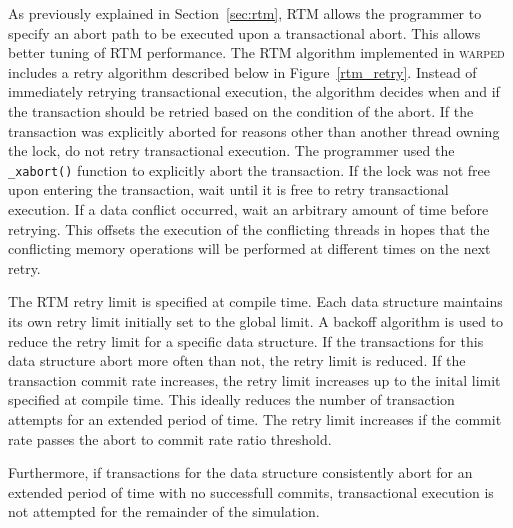 \documentclass[11pt]{book}
\begin{document}
As previously explained in Section~\ref{sec:rtm}, RTM allows the programmer to specify an
abort path to be executed upon a transactional abort.  This allows better tuning of RTM
performance.  The RTM algorithm implemented in \textsc{warped} includes a retry algorithm
described below in Figure~\ref{rtm_retry}.  Instead of immediately retrying transactional
execution, the algorithm decides when and if the transaction should be retried based on
the condition of the abort.  If the transaction was explicitly aborted for reasons other
than another thread owning the lock, do not retry transactional execution.  The programmer
used the \texttt{\_xabort()} function to explicitly abort the transaction. If the lock was
not free upon entering the transaction, wait until it is free to retry transactional
execution.  If a data conflict occurred, wait an arbitrary amount of time before retrying.
This offsets the execution of the conflicting threads in hopes that the conflicting memory
operations will be performed at different times on the next retry.

The RTM retry limit is specified at compile time.  Each data structure maintains its own
retry limit initially set to the global limit.  A backoff algorithm is used to reduce the
retry limit for a specific data structure.  If the transactions for this data structure
abort more often than not, the retry limit is reduced.  If the transaction commit rate
increases, the retry limit increases up to the inital limit specified at compile time.
This ideally reduces the number of transaction attempts for an extended period of time.
The retry limit increases if the commit rate passes the abort to commit rate ratio
threshold.

Furthermore, if transactions for the data structure consistently abort for an extended
period of time with no successfull commits, transactional execution is not attempted for
the remainder of the simulation.
\end{document}
